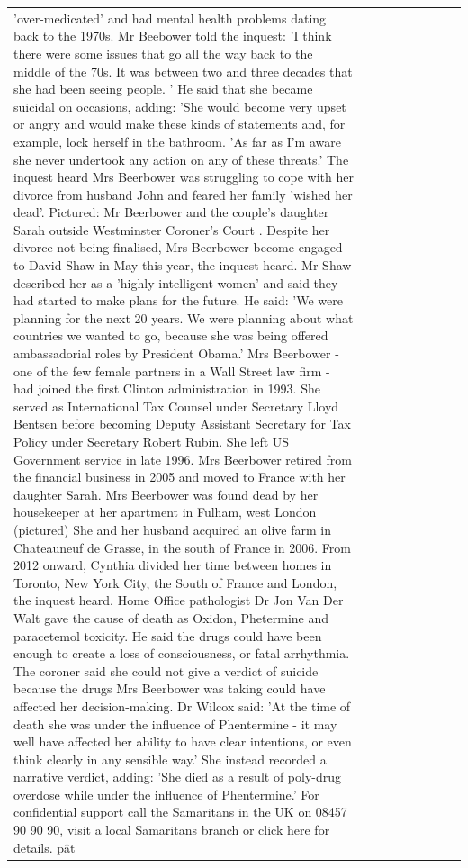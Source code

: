 \begin{table}[H]
\begin{tabular}{lllrlllll}
'over-medicated' and had mental health problems dating back to the 1970s. Mr Beebower told the inquest: 'I think there were some issues that go all the way back to the middle of the 70s. It was between two and three decades that she had been seeing people. ' He said that she became suicidal on occasions, adding: 'She would become very upset or angry and would make these kinds of statements and, for example, lock herself in the bathroom. 'As far as I'm aware she never undertook any action on any of these threats.' The inquest heard Mrs Beerbower was struggling to cope with her divorce from husband John and feared her family 'wished her dead'. Pictured: Mr Beerbower and the couple's daughter Sarah outside Westminster Coroner's Court . Despite her divorce not being finalised, Mrs Beerbower become engaged to David Shaw in May this year, the inquest heard. Mr Shaw described her as a 'highly intelligent women' and said they had started to make plans for the future. He said: 'We were planning for the next 20 years. We were planning about what countries we wanted to go, because she was being offered ambassadorial roles by President Obama.' Mrs Beerbower - one of the few female partners in a Wall Street law firm - had joined the first Clinton administration in 1993. She served as International Tax Counsel under Secretary Lloyd Bentsen before becoming Deputy Assistant Secretary for Tax Policy under Secretary Robert Rubin. She left US Government service in late 1996. Mrs Beerbower retired from the financial business in 2005 and moved to France with her daughter Sarah. Mrs Beerbower was found dead by her housekeeper at her apartment in Fulham, west London (pictured) She and her husband acquired an olive farm in Chateauneuf de Grasse, in the south of France in 2006. From 2012 onward, Cynthia divided her time between homes in Toronto, New York City, the South of France and London, the inquest heard. Home Office pathologist Dr Jon Van Der Walt gave the cause of death as Oxidon, Phetermine and paracetemol toxicity. He said the drugs could have been enough to create a loss of consciousness, or fatal arrhythmia. The coroner said she could not give a verdict of suicide because the drugs Mrs Beerbower was taking could have affected her decision-making. Dr Wilcox said: 'At the time of death she was under the influence of Phentermine - it may well have affected her ability to have clear intentions, or even think clearly in any sensible way.' She instead recorded a narrative verdict, adding: 'She died as a result of poly-drug overdose while under the influence of Phentermine.' For confidential support call the Samaritans in the UK on 08457 90 90 90, visit a local Samaritans branch or click here for details. pât \\

\end{tabular}
\end{table}
